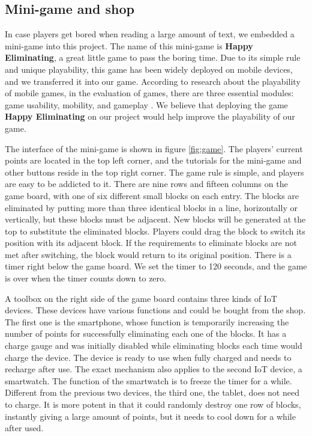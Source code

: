 \documentclass[msc,deptreport,ai]{infthesis}      %
\begin{document}
\subsection{Mini-game and shop}
\label{section:mini-game}

In case players get bored when reading a large amount of text, we embedded a mini-game into this project. The name of this mini-game is \textbf{Happy Eliminating}, a great little game to pass the boring time. Due to its simple rule and unique playability, this game has been widely deployed on mobile devices, and we transferred it into our game. According to research about the playability of mobile games, in the evaluation of games, there are three essential modules: game usability, mobility, and gameplay \cite{Korhonen}. We believe that deploying the game \textbf{Happy Eliminating} on our project would help improve the playability of our game. 

The interface of the mini-game is shown in figure \ref{fig:game}. The players' current points are located in the top left corner, and the tutorials for the mini-game and other buttons reside in the top right corner. The game rule is simple, and players are easy to be addicted to it. There are nine rows and fifteen columns on the game board, with one of six different small blocks on each entry. The blocks are eliminated by putting more than three identical blocks in a line, horizontally or vertically, but these blocks must be adjacent. New blocks will be generated at the top to substitute the eliminated blocks. Players could drag the block to switch its position with its adjacent block. If the requirements to eliminate blocks are not met after switching, the block would return to its original position. There is a timer right below the game board. We set the timer to 120 seconds, and the game is over when the timer counts down to zero.

A toolbox on the right side of the game board contains three kinds of IoT devices. These devices have various functions and could be bought from the shop. The first one is the smartphone, whose function is temporarily increasing the number of points for successfully eliminating each one of the blocks. It has a charge gauge and was initially disabled while eliminating blocks each time would charge the device. The device is ready to use when fully charged and needs to recharge after use. The exact mechanism also applies to the second IoT device, a smartwatch. The function of the smartwatch is to freeze the timer for a while. Different from the previous two devices, the third one, the tablet, does not need to charge. It is more potent in that it could randomly destroy one row of blocks, instantly giving a large amount of points, but it needs to cool down for a while after used.
\end{document}
